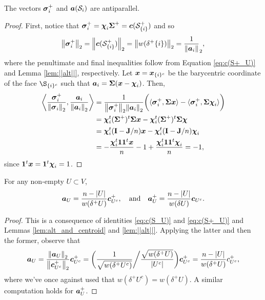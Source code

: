 \begin{lemma}
\label{lem:svi^+ai_parallel}
The vectors $\vb*{\sigma}_i^+$ and $\vb*{a}(\mathcal{S}_i)$ are antiparallel. 
\end{lemma}
\begin{proof}
First, notice that $\vb*{\sigma}_i^+=\boldsymbol{\chi}_i \boldsymbol{\Sigma}^+=\vb*{c}(\mathcal{S}^+_{\{i\}})$ and so \begin{equation*}
    \norm{\vb*{\sigma}_i^+}_2 = \norm{\vb*{c}(\mathcal{S}^+_{\{i\}})}_2 = \norm{ w(\delta^+ \{i\})}_2 = \frac{1}{\norm{\vb*{a}_i}}_2,
\end{equation*}
where the penultimate and final inequalities follow from Equation \eqref{eq:c(S+_U)} and Lemma \ref{lem:||alt||}, respectively. Let $\vb*{x}=\vb*{x}_{\{i\}^c}$ be the barycentric coordinate of the face $\S_{\{i\}^c}$ such that $\vb*{a}_i = \boldsymbol{\Sigma}(\vb*{x}-\boldsymbol{\chi}_i)$. Then, 
\begin{align*}
    \bigg\langle \frac{\vb*{\sigma}_i^+}{\norm{\vb*{\sigma}_i}_2},\frac{\vb*{a}_i}{\norm{\vb*{a}_i}_2}\bigg \rangle 
    &= \frac{1}{\norm{\vb*{\sigma}^+_i}_2\norm{\vb*{a}_i}_2} \bigg( \langle \vb*{\sigma}_i^+,\boldsymbol{\Sigma}\vb*{x}\rangle - \langle \vb*{\sigma}_i^+,\boldsymbol{\Sigma}\boldsymbol{\chi}_i\rangle \bigg) \\
    &= \boldsymbol{\chi}_i^t (\boldsymbol{\Sigma}^+)^t \boldsymbol{\Sigma} \vb*{x} - \boldsymbol{\chi}_i^t (\boldsymbol{\Sigma}^+)^t \boldsymbol{\Sigma}\boldsymbol{\chi} \\
    &= \boldsymbol{\chi}_i^t (\vb{I}-\vb{J}/n) \vb*{x} - \boldsymbol{\chi}_i^t(\vb{I}-\vb{J}/n) \boldsymbol{\chi}_i \\
    &= - \frac{\boldsymbol{\chi}_i^t \vb{1}\vb{1}^t \vb*{x} }{n} - 1 + \frac{\boldsymbol{\chi}_i^t \vb{1}\vb{1}^t \boldsymbol{\chi}_i}{n}=-1,
\end{align*}
since $\vb{1}^t \vb*{x}=\vb{1}^t \boldsymbol{\chi}_i=1$. 
\end{proof}

\begin{lemma}
\label{lem:alt}
For any non-empty $U\subset V$, 
\[\vb*{a}_U=\frac{n-|U|}{w(\delta^+ U)}\vb*{c}^+_{U^c},\quad \text{and}\quad \vb*{a}^+_U = \frac{n-|U|}{w(\delta U)} \vb*{c}_{U^c}.\]
\end{lemma}
\begin{proof}
This is a consequence of identities \eqref{eq:c(S_U)} and \eqref{eq:c(S+_U)} and Lemmas \ref{lem:alt_and_centroid} and \ref{lem:||alt||}. Applying the latter and then the former, observe that 
\[\vb*{a}_U = \frac{\norm{\vb*{a}_U}_2}{\norm{\vb*{c}^+_{U^c}}_2}\vb*{c}^+_{U^c} =
\bigg(\frac{1}{\sqrt{w(\delta^+ U^c)}} \bigg/\frac{\sqrt{w(\delta^+U)}}{|U^c|} \bigg)\vb*{c}^+_{U^c} = \frac{n-|U|}{w(\delta^+U)}c^+_{U^c},\]
where we've once against used that $w(\delta^+ U^c )=w(\delta^+ U)$. A similar computation holds for $\vb*{a}_U^+$.  
\end{proof}


